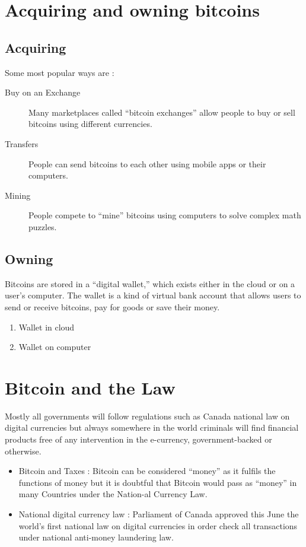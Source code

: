 \documentclass{article}
\begin{document}
\section{Acquiring and owning bitcoins}

    \subsection{Acquiring}
        Some most popular ways are : 
        \begin{description}
            \item[Buy on an Exchange]Many marketplaces called “bitcoin exchanges” allow people to buy or sell bitcoins using different currencies.
            \item[Transfers] People can send bitcoins to each other using mobile apps or their computers.
            \item[Mining] People compete to “mine” bitcoins using computers to solve complex math puzzles.
        \end{description}
        
    \subsection{Owning}    
      Bitcoins are stored in a “digital wallet,” which exists either in the cloud or on a user’s computer. The wallet is a kind of virtual bank account that allows users to send or receive bitcoins, pay for goods or save their money.
        \begin{enumerate}
            \item Wallet in cloud
            \item Wallet on computer
        \end{enumerate}
        
\newpage

\section{Bitcoin and the Law}
Mostly all governments will follow regulations such as Canada national law on digital currencies but always somewhere in the world criminals will find financial products free of any intervention in the e-currency, government-backed or otherwise.
    \begin{itemize}
        \item Bitcoin and Taxes :  Bitcoin can be considered “money” as it fulfils the functions of money but it is doubtful that Bitcoin would pass as “money” in many Countries under the Nation-al Currency Law.
        \item National digital currency law : Parliament of Canada approved this June the world’s first national law on digital currencies in order check all transactions under national anti-money laundering law.
    \end{itemize}
    
\end{document}
